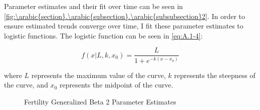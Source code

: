 \documentclass[10pt]{article}
\renewcommand{\thesection}{\arabic{section}}
\renewcommand{\thesubsection}{\thesection.\arabic{subsection}}
\renewcommand{\thesubsubsection}{\thesubsection.\arabic{subsubsection}}
\numberwithin{equation}{subsection}
\newcommand*{\FigureDir}{../../graphs}
\begin{document}
\begin{appendices}
\noindent
Parameter estimates and their fit over time can be seen in \autoref{fig:\thesubsubsection2}. In order to ensure estimated trends converge over time, I fit these parameter estimates to logistic functions. The logistic function can be seen in \ref{eq:A.1-4}:

\begin{equation}
   f(x|L, k, x_0) = \frac{L}{1 + e^{-k(x-x_0)}}
\end{equation}

\noindent
where \(L\) represents the maximum value of the curve, \(k\) represents the steepness of the curve, and \(x_0\) represents the midpoint of the curve.

\begin{figure}[H]
   \centering
   \caption{\label{fig:\thesubsubsection2}Fertility Generalized Beta 2 Parameter Estimates}
\end{figure}


\end{appendices}
\end{document}
